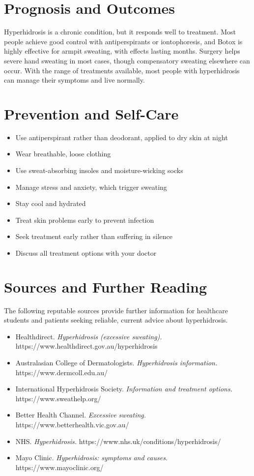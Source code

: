 \section*{Prognosis and Outcomes}
Hyperhidrosis is a chronic condition, but it responds well to treatment. Most people achieve good control with antiperspirants or iontophoresis, and Botox is highly effective for armpit sweating, with effects lasting months. Surgery helps severe hand sweating in most cases, though compensatory sweating elsewhere can occur. With the range of treatments available, most people with hyperhidrosis can manage their symptoms and live normally.

\section*{Prevention and Self-Care}
\begin{itemize}
    \item Use antiperspirant rather than deodorant, applied to dry skin at night
    \item Wear breathable, loose clothing
    \item Use sweat-absorbing insoles and moisture-wicking socks
    \item Manage stress and anxiety, which trigger sweating
    \item Stay cool and hydrated
    \item Treat skin problems early to prevent infection
    \item Seek treatment early rather than suffering in silence
    \item Discuss all treatment options with your doctor
\end{itemize}

\section*{Sources and Further Reading}
The following reputable sources provide further information for healthcare students and patients seeking reliable, current advice about hyperhidrosis.

\begin{itemize}
    \item Healthdirect. \textit{Hyperhidrosis (excessive sweating).} https://www.healthdirect.gov.au/hyperhidrosis
    \item Australasian College of Dermatologists. \textit{Hyperhidrosis information.} https://www.dermcoll.edu.au/
    \item International Hyperhidrosis Society. \textit{Information and treatment options.} https://www.sweathelp.org/
    \item Better Health Channel. \textit{Excessive sweating.} https://www.betterhealth.vic.gov.au/
    \item NHS. \textit{Hyperhidrosis.} https://www.nhs.uk/conditions/hyperhidrosis/
    \item Mayo Clinic. \textit{Hyperhidrosis: symptoms and causes.} https://www.mayoclinic.org/
\end{itemize}
